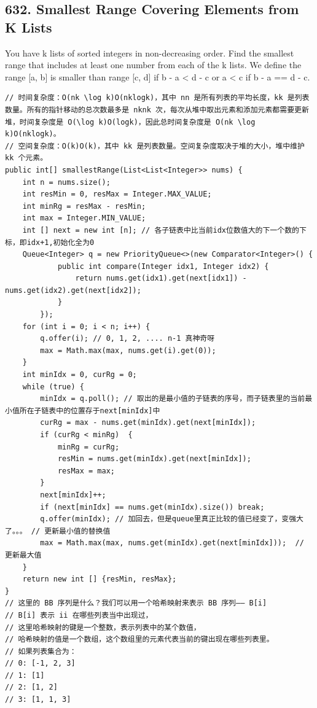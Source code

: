 \documentclass[9pt, b5paper]{article}
\begin{document}
\subsection{632. Smallest Range Covering Elements from K Lists}
\label{sec-5-5}
You have k lists of sorted integers in non-decreasing order. Find the smallest range that includes at least one number from each of the k lists.
We define the range [a, b] is smaller than range [c, d] if b - a < d - c or a < c if b - a == d - c.
\begin{verbatim}
// 时间复杂度：O(nk \log k)O(nklogk)，其中 nn 是所有列表的平均长度，kk 是列表数量。所有的指针移动的总次数最多是 nknk 次，每次从堆中取出元素和添加元素都需要更新堆，时间复杂度是 O(\log k)O(logk)，因此总时间复杂度是 O(nk \log k)O(nklogk)。
// 空间复杂度：O(k)O(k)，其中 kk 是列表数量。空间复杂度取决于堆的大小，堆中维护 kk 个元素。
public int[] smallestRange(List<List<Integer>> nums) {
    int n = nums.size();
    int resMin = 0, resMax = Integer.MAX_VALUE;
    int minRg = resMax - resMin;
    int max = Integer.MIN_VALUE;
    int [] next = new int [n]; // 各子链表中比当前idx位数值大的下一个数的下标，即idx+1,初始化全为0
    Queue<Integer> q = new PriorityQueue<>(new Comparator<Integer>() {
            public int compare(Integer idx1, Integer idx2) {
                return nums.get(idx1).get(next[idx1]) - nums.get(idx2).get(next[idx2]);
            }
        });
    for (int i = 0; i < n; i++) {
        q.offer(i); // 0, 1, 2, .... n-1 真神奇呀
        max = Math.max(max, nums.get(i).get(0));
    }
    int minIdx = 0, curRg = 0;
    while (true) {
        minIdx = q.poll(); // 取出的是最小值的子链表的序号，而子链表里的当前最小值所在子链表中的位置存于next[minIdx]中
        curRg = max - nums.get(minIdx).get(next[minIdx]);
        if (curRg < minRg)  {
            minRg = curRg;
            resMin = nums.get(minIdx).get(next[minIdx]);
            resMax = max;
        }
        next[minIdx]++;
        if (next[minIdx] == nums.get(minIdx).size()) break;
        q.offer(minIdx); // 加回去，但是queue里真正比较的值已经变了，变强大了。。。 // 更新最小值的替换值 
        max = Math.max(max, nums.get(minIdx).get(next[minIdx]));  // 更新最大值
    }
    return new int [] {resMin, resMax};
}
// 这里的 BB 序列是什么？我们可以用一个哈希映射来表示 BB 序列—— B[i]
// B[i] 表示 ii 在哪些列表当中出现过，
// 这里哈希映射的键是一个整数，表示列表中的某个数值，
// 哈希映射的值是一个数组，这个数组里的元素代表当前的键出现在哪些列表里。
// 如果列表集合为：
// 0: [-1, 2, 3]
// 1: [1]
// 2: [1, 2]
// 3: [1, 1, 3]

\end{verbatim}
\end{document}
